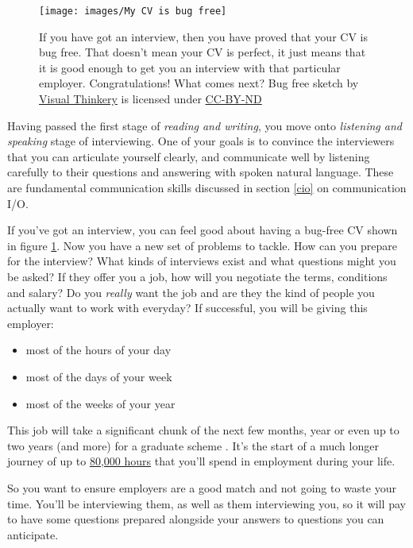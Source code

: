 \documentclass[
]{book}
\providecommand{\tightlist}{%
  \setlength{\itemsep}{0pt}\setlength{\parskip}{0pt}}
\begin{document}
\begin{figure}

{\centering \texttt{[image: images/My CV is bug free]} 

}

\caption{If you have got an interview, then you have proved that your CV is bug free. That doesn't mean your CV is perfect, it just means that it is good enough to get you an interview with that particular employer. Congratulations! What comes next? Bug free sketch by \href{https://visualthinkery.com/}{Visual Thinkery} is licensed under \href{https://creativecommons.org/licenses/by-nd/4.0/}{CC-BY-ND}}\label{fig:bugfree-fig}
\end{figure}



Having passed the first stage of \emph{reading and writing}, you move onto \emph{listening and speaking} stage of interviewing. One of your goals is to convince the interviewers that you can articulate yourself clearly, and communicate well by listening carefully to their questions and answering with spoken natural language. These are fundamental communication skills discussed in section \ref{cio} on communication I/O.

If you've got an interview, you can feel good about having a bug-free CV shown in figure \ref{fig:bugfree-fig}. Now you have a new set of problems to tackle. How can you prepare for the interview? What kinds of interviews exist and what questions might you be asked? If they offer you a job, how will you negotiate the terms, conditions and salary? Do you \emph{really} want the job and are they the kind of people you actually want to work with everyday? If successful, you will be giving this employer:

\begin{itemize}
\tightlist
\item
  most of the hours of your day
\item
  most of the days of your week
\item
  most of the weeks of your year
\end{itemize}

This job will take a significant chunk of the next few months, year or even up to two years (and more) for a graduate scheme \citep{jonathanblack}. It's the start of a much longer journey of up to \href{https://80000hours.org/}{80,000 hours} that you'll spend in employment during your life.

So you want to ensure employers are a good match and not going to waste your time. You'll be interviewing them, as well as them interviewing you, so it will pay to have some questions prepared alongside your answers to questions you can anticipate.
\end{document}
